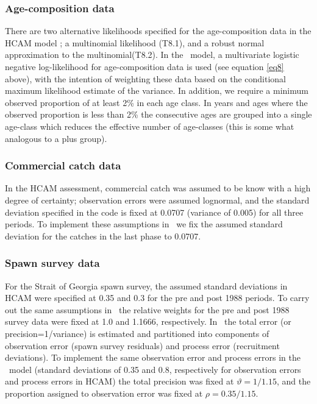 	
\subsubsection{Age-composition data}
There are two alternative likelihoods specified for the age-composition data in the HCAM model \citep[see Table 8 in Appendix B in][]{Clear2010};  a multinomial likelihood (T8.1), and a robust normal approximation to the multinomial(T8.2).  In the \iscam\ model, a multivariate logistic negative log-likelihood for age-composition data is used (see equation \ref{eq8} above), with the intention of weighting these data based on the conditional maximum likelihood estimate of the variance.  In addition, we require a minimum observed proportion of at least 2\% in each age class. In years and ages where the observed proportion is less than 2\% the consecutive ages are grouped into a single age-class which reduces the effective number of age-classes (this is some what analogous to a plus group).

\subsubsection{Commercial catch data}
	In the HCAM assessment, commercial catch was assumed to be know with a high degree of certainty; observation errors were assumed lognormal, and the standard deviation specified in the code is fixed at 0.0707 (variance of 0.005) for all three periods. To implement these assumptions in \iscam\ we fix the assumed standard deviation  for the catches in the last phase to 0.0707.%
	
\subsubsection{Spawn survey data}
 	For the Strait of Georgia spawn survey, the assumed standard deviations in HCAM were specified at 0.35 and 0.3 for the pre and post 1988 periods.  To carry out the same assumptions in \iscam\ the relative weights for the pre and post 1988 survey data were fixed at 1.0 and 1.1666, respectively.  In \iscam\ the total error (or precision=1/variance) is estimated and partitioned into components of observation error (spawn survey residuals) and process error (recruitment deviations).  To implement the same observation error and process errors in the \iscam\ model (standard deviations of 0.35 and 0.8, respectively for observation errors and process errors in HCAM) the total precision was fixed at $\vartheta=1/1.15$, and the proportion assigned to observation error was fixed at $\rho = 0.35/1.15$.

